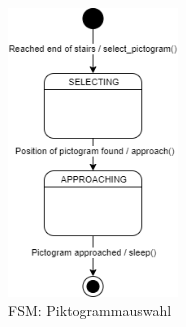 \begin{figure}[H]
  \includegraphics[width=0.40\textwidth]{img/softwarearchitektur/FSM-PICTOGRAM_SELECTION.png}
  \centering
  \caption{FSM: Piktogrammauswahl}
  \label{fig:fsm-pictogram-selection}
\end{figure}













